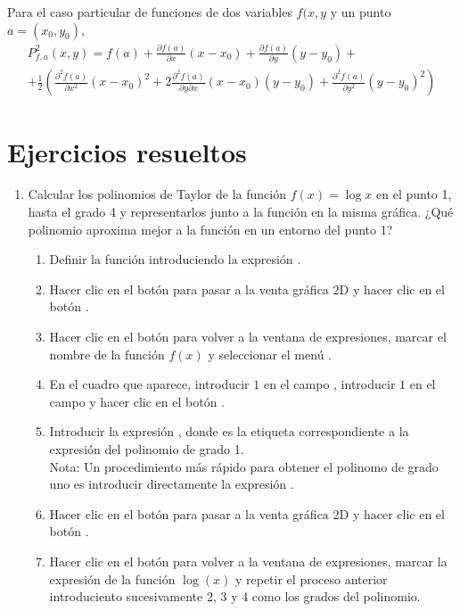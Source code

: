 Para el caso particular de funciones de dos variables $f(x,y$ y un punto $a=(x_0,y_0)$, 
\begin{multline*}
P^2_{f,a}(x,y) = f(a)+\frac{\partial f(a)}{\partial x}(x-x_0)+\frac{\partial f(a)}{\partial y}(y-y_0)+\\
+\frac{1}{2}\left(\frac{\partial^2 f(a)}{\partial x^2}(x-x_0)^2 + 2\frac{\partial^2 f(a)}{\partial y\partial x}
(x-x_0)(y-y_0) + \frac{\partial^2 f(a)}{\partial y^2}(y-y_0)^2\right)
\end{multline*}


\newpage

\section{Ejercicios resueltos}

\begin{enumerate}[leftmargin=*]
\item Calcular los polinomios de Taylor de la función $f(x)=\log x$ en el punto 1, hasta el grado 4 y representarlos
junto a la función en la misma gráfica.
¿Qué polinomio aproxima mejor a la función en un entorno del punto 1?

\begin{indicacion}
{\begin{enumerate}
\item Definir la función introduciendo la expresión . 
\item Hacer clic en el botón  para pasar a la venta gráfica 2D y hacer clic en el botón
.
\item Hacer clic en el botón   para volver a la ventana de expresiones,
marcar el nombre de la función $f(x)$ y seleccionar el menú .
\item En el cuadro que aparece, introducir $1$ en el campo , introducir $1$ en el campo  y
hacer clic en el botón .
\item Introducir la expresión , donde  es la etiqueta correspondiente a la expresión
del polinomio de grado 1.\\
Nota: Un procedimiento más rápido para obtener el polinomo de grado uno es introducir directamente la expresión
.
\item Hacer clic en el botón  para pasar a la venta gráfica 2D y hacer clic en el botón
.
\item Hacer clic en el botón  para volver a la ventana de expresiones, marcar la
expresión de la función $\log(x)$ y repetir el proceso anterior introduciento sucesivamente 2, 3 y 4 como los grados del polinomio.
\end{enumerate}
}
\end{indicacion}


\end{enumerate}
